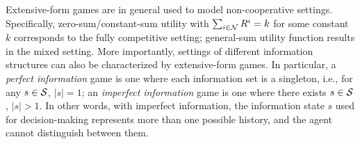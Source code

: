 \vspace{7pt}
\vspace{5pt}

Extensive-form games are in general used to model non-cooperative settings. 
Specifically, zero-sum/constant-sum utility with $\sum_{i\in\mathcal{N}}R^i=k$ for some constant $k$ corresponds to the fully competitive setting; general-sum utility function results in the mixed setting.  
More importantly, settings of different information structures can also be characterized  by   extensive-form games. In particular, a \emph{perfect information} game is  one where each information set is a singleton, i.e., for any $s\in{\mathcal{S}}$, $|s|=1$;  an \emph{imperfect information} game is  one where  there exists $s\in{\mathcal{S}}$, $|s|>1$. In other words, with  imperfect information, the information state $s$ used for decision-making represents more  than one possible history, and the agent cannot distinguish between them. 

